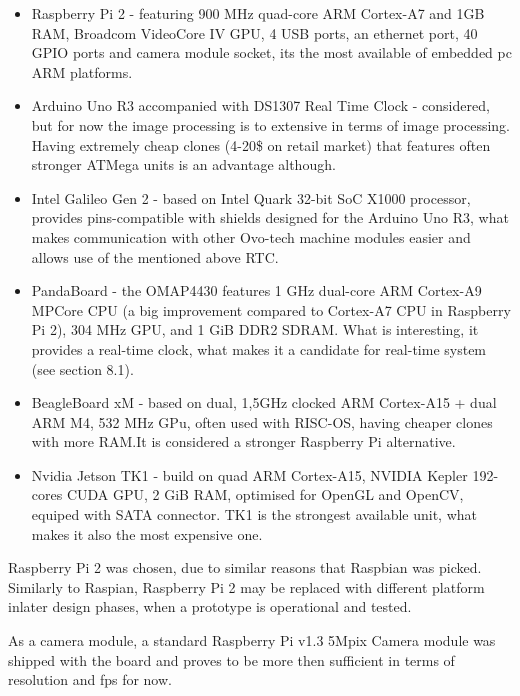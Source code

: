 \documentclass[12pt,twoside,a4paper]{article}
\begin{document}
\begin{itemize}
  \item Raspberry Pi 2 - featuring 900 MHz quad-core ARM Cortex-A7 and 1GB RAM, Broadcom VideoCore IV GPU, 4 USB ports, an ethernet port, 40 GPIO ports and camera module socket, its the most available of embedded pc ARM platforms.
  \item Arduino Uno R3 accompanied with DS1307 Real Time Clock - considered, but for now the image processing is to extensive in terms of image processing.
  Having extremely cheap clones (4-20\$ on retail market) that features often stronger ATMega units is an advantage although.
  \item Intel Galileo Gen 2 - based on Intel Quark 32-bit SoC X1000 processor, provides pins-compatible with shields designed for the Arduino Uno R3, what makes communication with other Ovo-tech machine modules easier and allows use of the mentioned above RTC.
  \item PandaBoard - the OMAP4430 features 1 GHz dual-core ARM Cortex-A9 MPCore CPU (a big improvement compared to Cortex-A7 CPU in Raspberry Pi 2), 304 MHz GPU, and 1 GiB DDR2 SDRAM.
  What is interesting, it provides a real-time clock, what makes it a candidate for real-time system (see section 8.1).
  \item BeagleBoard xM - based on dual, 1,5GHz clocked ARM Cortex-A15  + dual ARM M4, 532 MHz GPu, often used with RISC-OS, having cheaper clones with more RAM.It is considered a stronger Raspberry Pi alternative.
  \item Nvidia Jetson TK1 - build on quad ARM Cortex-A15, NVIDIA Kepler 192-cores CUDA GPU, 2 GiB RAM, optimised for OpenGL and OpenCV, equiped with SATA connector.
  TK1 is the strongest available unit, what makes it also the most expensive one.
\end{itemize}

Raspberry Pi 2 was chosen, due to similar reasons that Raspbian was picked.
Similarly to Raspian, Raspberry Pi 2 may be replaced with different platform inlater design phases, when a prototype is operational and tested.

As a camera module, a standard Raspberry Pi v1.3 5Mpix Camera module was shipped with the board and proves to be more then sufficient in terms of resolution and fps for now.




\newpage
\end{document}
